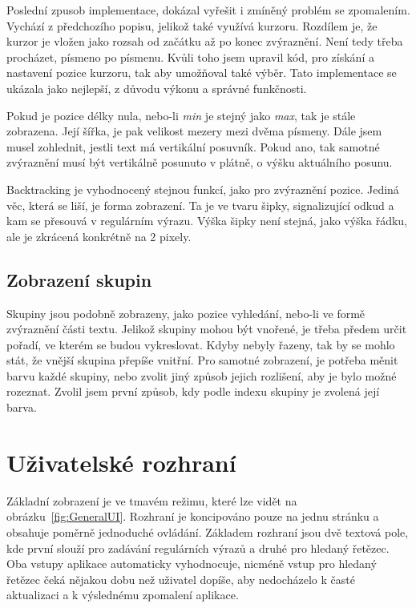 Poslední zpusob implementace, dokázal vyřešit i zmíněný problém se zpomalením.
Vychází z předchozího popisu, jelikož také využívá kurzoru.
Rozdílem je, že kurzor je vložen jako rozsah od začátku až po konec zvýraznění.
Není tedy třeba procházet, písmeno po písmenu.
Kvůli toho jsem upravil kód, pro získání a nastavení pozice kurzoru, tak aby umožňoval také výběr.
Tato implementace se ukázala jako nejlepší, z důvodu výkonu a správné funkčnosti.

Pokud je pozice délky nula, nebo-li \textit{min} je stejný jako \textit{max}, tak je stále zobrazena. 
Její šířka, je pak velikost mezery mezi dvěma písmeny. 
Dále jsem musel zohlednit, jestli text má vertikální posuvník. 
Pokud ano, tak samotné zvýraznění musí být vertikálně posunuto v plátně, o výšku aktuálního posunu.

Backtracking je vyhodnocený stejnou funkcí, jako pro zvýraznění pozice.
Jediná věc, která se liší, je forma zobrazení. 
Ta je ve tvaru šipky, signalizující odkud a kam se přesouvá v regulárním výrazu.
Výška šipky není stejná, jako výška řádku, ale je zkrácená konkrétně na 2 pixely.

\subsection*{Zobrazení skupin}

Skupiny jsou podobně zobrazeny, jako pozice vyhledání, nebo-li ve formě zvýraznění části textu.
Jelikož skupiny mohou být vnořené, je třeba předem určit pořadí, ve kterém se budou vykreslovat.
Kdyby nebyly řazeny, tak by se mohlo stát, že vnější skupina přepíše vnitřní.
Pro samotné zobrazení, je potřeba měnit barvu každé skupiny, nebo zvolit jiný způsob jejich rozlišení, aby je bylo možné rozeznat.
Zvolil jsem první způsob, kdy podle indexu skupiny je zvolená její barva.

\section{Uživatelské rozhraní}

Základní zobrazení je ve tmavém režimu, které lze vidět na obrázku~\ref{fig:GeneralUI}.
Rozhraní je koncipováno pouze na jednu stránku a obsahuje poměrně jednoduché ovládání.
Základem rozhraní jsou dvě textová pole, kde první slouží pro zadávání regulárních výrazů a druhé pro hledaný řetězec.
Oba vstupy aplikace automaticky vyhodnocuje, nicméně vstup pro hledaný řetězec čeká nějakou dobu než uživatel dopíše, aby nedocházelo k časté aktualizaci a k výslednému zpomalení aplikace.

